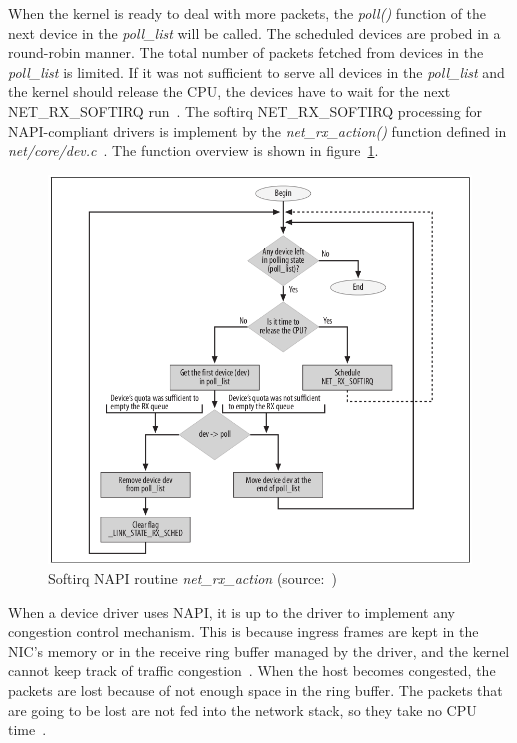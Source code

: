 When the kernel is ready to deal with more packets, the {\it{poll()}} function of the next device
in the {\it{poll\_list}} will be called.
The scheduled devices are probed in a round-robin manner.
The total number of packets fetched from devices in the {\it{poll\_list}} is limited.
If it was not sufficient to serve all devices in the {\it{poll\_list}} and the kernel should release the CPU,
the devices have to wait for the next NET\_RX\_SOFTIRQ run~\cite{understanding-internals}.
The softirq NET\_RX\_SOFTIRQ processing for NAPI-compliant drivers
is implement by the {\it{net\_rx\_action()}} function defined in {\it{net/core/dev.c}}~\cite{kernel-source}.
The function overview is shown in figure~\ref{fig:linux-softirq-napi}.

\begin{figure}
	\centering
	\includegraphics[width=14.5cm,keepaspectratio]{fig/net_rq_softirq.png}
	\caption{Softirq NAPI routine {\it{net\_rx\_action}} (source:~\cite{understanding-internals})}
	\label{fig:linux-softirq-napi}
\end{figure}

When a device driver uses NAPI, it is up to
the driver to implement any congestion control mechanism.
This is because ingress frames are kept in the NIC's memory or in the receive ring buffer managed by the driver,
and the kernel cannot keep track of traffic congestion~\cite{understanding-internals}.
When the host becomes congested, the packets are lost because of not enough space in the ring buffer.
The packets that are going to be lost are not fed into the network stack, so they take no CPU time~\cite{haifux-lecture}.

